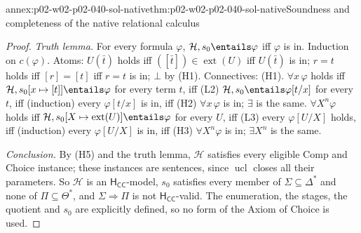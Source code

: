 \begin{annexitem}{annex:p02-w02-p02-040-sol-native}{thm:p02-w02-p02-040-sol-native}{Soundness and completeness of the native relational calculus}
\begin{proof}
\emph{Truth lemma.}  For every formula \(\varphi\),
\(\mathcal H,s_0\entails\varphi\) iff \(\varphi\) is in.  Induction on
\(c(\varphi)\).  Atoms: \(U(\bar t)\) holds iff \(([\bar t])\in\operatorname{ext}(U)\)
iff \(U(\bar t)\) is in; \(r=t\) holds iff \([r]=[t]\) iff \(r=t\) is in; \(\bot\)
by (H1).  Connectives: (H1).  \(\forall x\,\varphi\) holds iff
\(\mathcal H,s_0[x\mapsto[t]]\entails\varphi\) for every term \(t\), iff (L2)
\(\mathcal H,s_0\entails\varphi[t/x]\) for every \(t\), iff (induction) every
\(\varphi[t/x]\) is in, iff (H2) \(\forall x\,\varphi\) is in; \(\exists\) is the
same.  \(\forall X^n\varphi\) holds iff
\(\mathcal H,s_0[X\mapsto\operatorname{ext}(U)]\entails\varphi\) for every \(U\), iff
(L3) every \(\varphi[U/X]\) holds, iff (induction) every \(\varphi[U/X]\) is
in, iff (H3) \(\forall X^n\varphi\) is in; \(\exists X^n\) is the same.

\emph{Conclusion.}  By (H5) and the truth lemma, \(\mathcal H\) satisfies every
eligible Comp and Choice instance; these instances are sentences, since
\(\operatorname{ucl}\) closes all their parameters.  So \(\mathcal H\) is an
\(\mathsf H_{\mathsf{CC}}\)-model, \(s_0\) satisfies every member of
\(\Sigma\subseteq\Delta^*\) and none of \(\Pi\subseteq\Theta^*\), and
\(\Sigma\Rightarrow\Pi\) is not \(\mathsf H_{\mathsf{CC}}\)-valid.  The
enumeration, the stages, the quotient and \(s_0\) are explicitly defined, so
no form of the Axiom of Choice is used.
\end{proof}
\end{annexitem}

